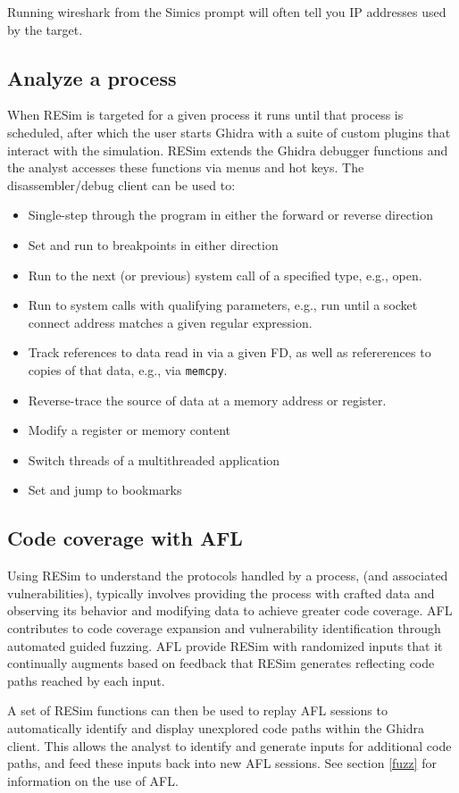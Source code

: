 \documentclass[titlepage]{article}
\begin{document}
Running wireshark from the Simics prompt will often tell you IP addresses used by the target.

\subsection{Analyze a process}
When RESim is targeted for a given process it runs until that process is scheduled, after which the user starts Ghidra with a suite of custom plugins that interact with the simulation.  
RESim extends the Ghidra debugger functions and the analyst accesses these functions via menus and hot keys.   The disassembler/debug client can be used to:
\begin{itemize}
\item Single-step through the program in either the forward or reverse direction
\item Set and run to breakpoints in either direction
\item Run to the next (or previous) system call of a specified type, e.g., open.
\item Run to system calls with qualifying parameters, e.g., run until a socket connect address matches a given regular expression.
\item Track references to data read in via a given FD, as well as refererences to copies of that data, e.g., via {\tt memcpy}.
\item Reverse-trace the source of data at a memory address or register.
\item Modify a register or memory content
\item Switch threads of a multithreaded application
\item Set and jump to bookmarks
\end{itemize}

\subsection{Code coverage with AFL}
Using RESim to understand the protocols handled by a process, (and associated vulnerabilities),  typically involves providing the process with
crafted data and observing its behavior and modifying data to achieve greater code coverage.  AFL contributes to code coverage expansion
and vulnerability identification through automated guided fuzzing.  AFL provide RESim with randomized inputs that 
it continually augments based on feedback that RESim generates reflecting code paths reached by each input.  

A set of RESim functions can then be used to replay AFL sessions to automatically identify and display unexplored code paths within
the Ghidra client.  This allows the analyst to identify and generate inputs for additional code paths, and feed these inputs back into 
new AFL sessions.  See section \ref{fuzz} for information on the use of AFL.
\end{document}
